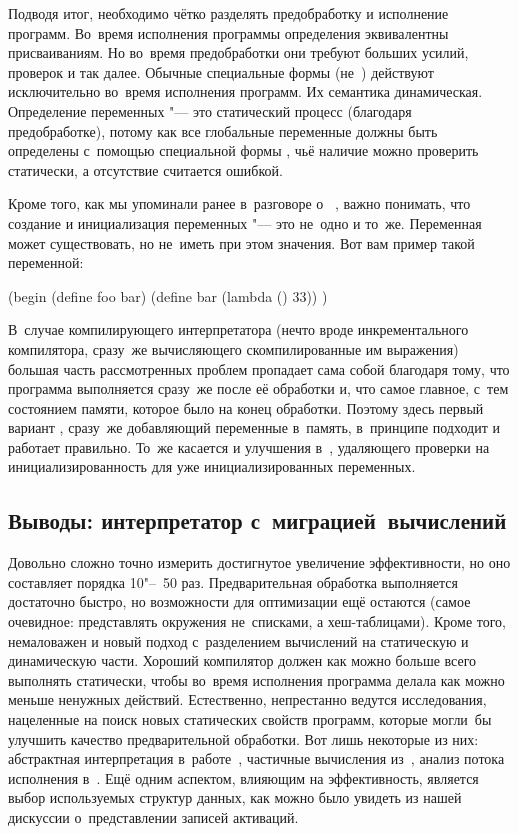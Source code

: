 
Подводя итог, необходимо чётко разделять предобработку и исполнение программ.
Во~время исполнения программы определения эквивалентны присваиваниям. Но
во~время предобработки они требуют больших усилий, проверок и так далее. Обычные
специальные формы (не~) действуют исключительно во~время исполнения
программ. Их семантика динамическая. Определение переменных "--- это статический
процесс (благодаря предобработке), потому как все глобальные переменные должны
быть определены с~помощью специальной формы , чьё наличие можно
проверить статически, а отсутствие считается ошибкой.

Кроме того, как мы упоминали ранее в~разговоре о~
, важно понимать, что
создание и инициализация переменных "--- это не~одно и то~же. Переменная может
существовать, но не~иметь при этом значения. Вот вам пример такой переменной:

\begin{code:lisp}
(begin (define foo bar)
       (define bar (lambda () 33)) )
\end{code:lisp}

В~случае компилирующего интерпретатора (нечто вроде инкрементального
компилятора, сразу~же вычисляющего скомпилированные им выражения) большая часть
рассмотренных проблем пропадает сама собой благодаря тому, что программа
выполняется сразу~же после её обработки и, что самое главное, с~тем состоянием
памяти, которое было на конец обработки. Поэтому здесь первый вариант
, сразу~же добавляющий переменные в~память,
в~принципе подходит и работает правильно. То~же касается и улучшения
в~, удаляющего проверки на инициализированность для уже
инициализированных переменных.


\subsection{Выводы: интерпретатор с~миграцией~вычислений}%
\label{fast/fast/ssect:conclusions}

Довольно сложно точно измерить достигнутое увеличение эффективности, но оно
составляет порядка 10"--~50 раз. Предварительная обработка выполняется
достаточно быстро, но возможности для оптимизации ещё остаются (самое очевидное:
представлять окружения не~списками, а хеш-таблицами). Кроме того, немаловажен и
новый подход с~разделением вычислений на статическую и динамическую части.
Хороший компилятор должен как можно больше всего выполнять статически, чтобы
во~время исполнения программа делала как можно меньше ненужных действий.
Естественно, непрестанно ведутся исследования, нацеленные на поиск новых
статических свойств программ, которые могли~бы улучшить качество
предварительной обработки. Вот лишь некоторые из них: абстрактная интерпретация
в~работе~\cite{cc77}, частичные вычисления из~\cite{jgs93}, анализ потока
исполнения в~\cite{shi91}. Ещё одним аспектом, влияющим на эффективность,
является выбор используемых структур данных, как можно было увидеть из нашей
дискуссии о~представлении записей активаций.

